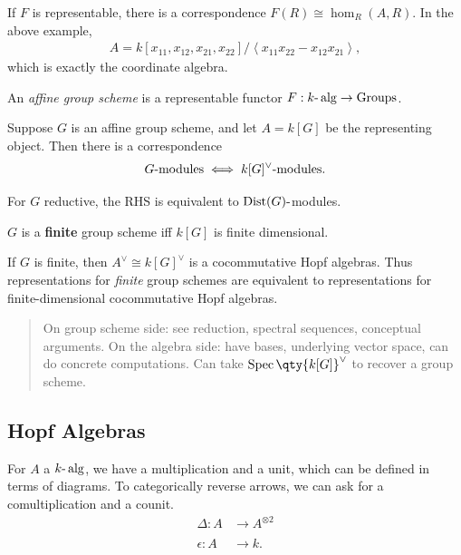If \(F\) is representable, there is a correspondence
\(F(R) \cong \hom_R(A, R)\). In the above example,
\begin{align*}A = k[x_{11}, x_{12}, x_{21}, x_{22}] / \left\langle{x_{11} x_{22} - x_{12}x_{21}}\right\rangle,\end{align*}
which is exactly the coordinate algebra.

\begin{definition}

An \emph{affine group scheme} is a representable functor
\(F:k{\hbox{-}}\operatorname{alg}\to{\operatorname{Groups}}\).

\end{definition}

Suppose \(G\) is an affine group scheme, and let \(A = k[G]\) be the
representing object. Then there is a correspondence
\begin{align*}  
G{\hbox{-}}\text{modules} \iff k[G]^\vee{\hbox{-}}\text{modules}
.\end{align*}

For \(G\) reductive, the RHS is equivalent to
\(\operatorname{Dist}(G){\hbox{-}}\)modules.

\begin{definition}

\(G\) is a \textbf{finite} group scheme iff \(k[G]\) is finite
dimensional.

\end{definition}

If \(G\) is finite, then \(A^\vee\cong k[G]^\vee\) is a cocommutative
Hopf algebras. Thus representations for \emph{finite} group schemes are
equivalent to representations for finite-dimensional cocommutative Hopf
algebras.

\begin{quote}
On group scheme side: see reduction, spectral sequences, conceptual
arguments. On the algebra side: have bases, underlying vector space, can
do concrete computations. Can take
\(\operatorname{Spec}\qty{k[G]}^\vee\) to recover a group scheme.
\end{quote}

\hypertarget{hopf-algebras}{%
\subsection{Hopf Algebras}\label{hopf-algebras}}

For \(A\) a \(k{\hbox{-}}\operatorname{alg}\), we have a multiplication
and a unit, which can be defined in terms of diagrams. To categorically
reverse arrows, we can ask for a comultiplication and a counit.
\begin{align*}  
\Delta: A &\to A^{\otimes 2}
\\ \\
\epsilon: A &\to k 
.\end{align*}

